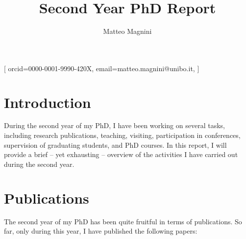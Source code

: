 \documentclass[
]{ceurart}
\begin{document}


\title{Second Year PhD Report}


\author[1]{Matteo Magnini}[%
orcid=0000-0001-9990-420X,
email=matteo.magnini@unibo.it,
]

\address[1]{Department of Computer Science and Engineering, University of Bologna, Via dell'Università 50, Cesena, Italy}



\maketitle

\section{Introduction}
\label{sec:introduction}

During the second year of my PhD, I have been working on several tasks, including research publications, teaching, visiting, participation in conferences, supervision of graduating students, and PhD courses.
%
In this report, I will provide a brief -- yet exhausting -- overview of the activities I have carried out during the second year.

\section{Publications}
\label{sec:publications}

The second year of my PhD has been quite fruitful in terms of publications.
%
So far, only during this year, I have published the following papers:
%
\begin{description}
    \item ~\cite{DBLP:conf/woa/RafanelliMACO24}
    \item ~\cite{DBLP:conf/percom/MontagnaAFPKUM24}
    \item ~\cite{DBLP:conf/dlog/MagniniOS24}
    \item ~\cite{DBLP:journals/csur/CiattoSAMO24}
\end{description}
%
\end{document}
